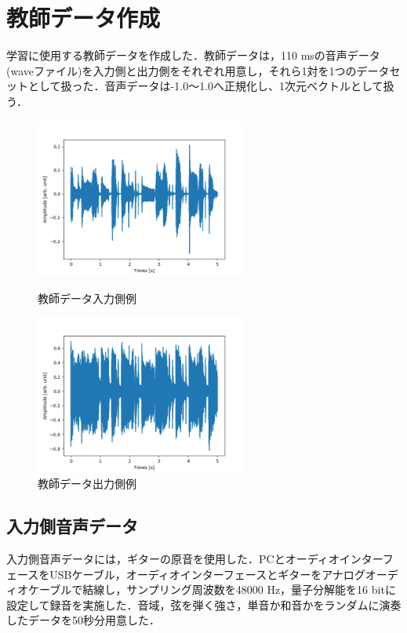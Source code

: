 \documentclass{jreport}		%
\begin{document}
\section{教師データ作成}
学習に使用する教師データを作成した．教師データは，110 msの音声データ(waveファイル)を入力側と出力側をそれぞれ用意し，それら1対を1つのデータセットとして扱った．音声データは-1.0～1.0へ正規化し、1次元ベクトルとして扱う．
\begin{figure}[htbp]
 \begin{minipage}{0.5\hsize}
 \begin{center}
  \includegraphics[width=70mm]{train_x0.png}
 \end{center}
 \caption{教師データ入力側例}
 \label{fig:one}
 \end{minipage}
 \begin{minipage}{0.5\hsize}
 \begin{center}
  \includegraphics[width=70mm]{train_y0.png}
 \end{center}
 \caption{教師データ出力側例}
 \label{fig:two}
 \end{minipage}
\end{figure}

\subsection{入力側音声データ}
入力側音声データには，ギターの原音を使用した．PCとオーディオインターフェースをUSBケーブル，オーディオインターフェースとギターをアナログオーディオケーブルで結線し，サンプリング周波数を48000 Hz，量子分解能を16 bitに設定して録音を実施した．音域，弦を弾く強さ，単音か和音かをランダムに演奏したデータを50秒分用意した．
\end{document}
